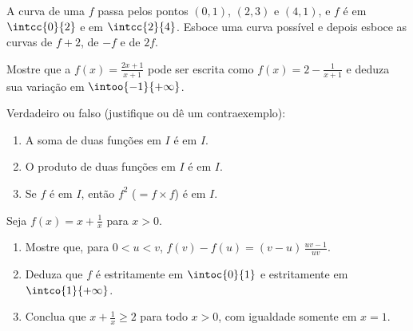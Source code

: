 \begin{exercise}[$\star\star$]\label{exo:g11:func:8}
A curva de uma  $f$ passa pelos pontos $(0, 1)$, $(2, 3)$ e
$(4, 1)$, e $f$ é  em $\intcc{0}{2}$ e  em
$\intcc{2}{4}$. Esboce uma curva possível e depois esboce as curvas de
$f + 2$, de $-f$ e de $2f$.
\end{exercise}

\begin{exercise}[$\star\star$]\label{exo:g11:func:9}
Mostre que a  $f(x) = \frac{2x+1}{x+1}$ pode ser escrita como
$f(x) = 2 - \frac{1}{x+1}$ e deduza sua variação em
$\intoo{-1}{+\infty}$.
\end{exercise}

\begin{exercise}[$\star\star$]\label{exo:g11:func:10}
Verdadeiro ou falso (justifique ou dê um contraexemplo):
\begin{enumerate}
  \item A soma de duas funções  em $I$ é  em $I$.
  \item O produto de duas funções  em $I$ é  em $I$.
  \item Se $f$ é  em $I$, então $f^2$ ($= f \times f$) é
         em $I$.
\end{enumerate}
\end{exercise}

\begin{exercise}[$\star\star\star$]\label{exo:g11:func:11}
Seja $f(x) = x + \frac{1}{x}$ para $x > 0$.
\begin{enumerate}
  \item Mostre que, para $0 < u < v$,
        $f(v) - f(u) = (v - u)\,\frac{uv - 1}{uv}$.
  \item Deduza que $f$ é estritamente  em $\intoc{0}{1}$ e
        estritamente  em $\intco{1}{+\infty}$.
  \item Conclua que $x + \frac1x \geq 2$ para todo $x > 0$, com igualdade
        somente em $x = 1$.
\end{enumerate}
\end{exercise}

